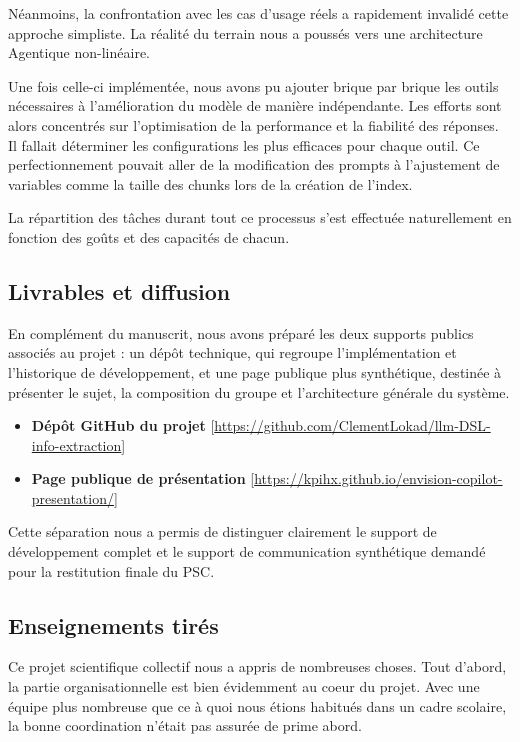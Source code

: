 Néanmoins, la confrontation avec les cas d'usage réels a rapidement invalidé cette approche simpliste. La réalité du terrain nous a poussés vers une architecture Agentique non-linéaire.

Une fois celle-ci implémentée, nous avons pu ajouter brique par brique les outils nécessaires à l'amélioration du modèle de manière indépendante. Les efforts sont alors concentrés sur l'optimisation de la performance et la fiabilité des réponses. Il fallait déterminer les configurations les plus efficaces pour chaque outil. Ce perfectionnement pouvait aller de la modification des prompts à l'ajustement de variables comme la taille des chunks lors de la création de l'index.

La répartition des tâches durant tout ce processus s’est effectuée naturellement en fonction des goûts et des capacités de chacun. 

\subsection{Livrables et diffusion}
En complément du manuscrit, nous avons préparé les deux supports publics associés au projet : un dépôt technique, qui regroupe l'implémentation et l'historique de développement, et une page publique plus synthétique, destinée à présenter le sujet, la composition du groupe et l'architecture générale du système.

\begin{itemize}
    \item \textbf{\textcolor{blue!70!black}{Dépôt GitHub du projet}} [\url{https://github.com/ClementLokad/llm-DSL-info-extraction}]
    \item \textbf{\textcolor{green!45!black}{Page publique de présentation}} [\url{https://kpihx.github.io/envision-copilot-presentation/}]
\end{itemize}

Cette séparation nous a permis de distinguer clairement le support de développement complet et le support de communication synthétique demandé pour la restitution finale du PSC.

\subsection{Enseignements tirés}
    Ce projet scientifique collectif nous a appris de nombreuses choses.
Tout d'abord, la partie organisationnelle est bien évidemment au coeur du projet. Avec une équipe plus nombreuse que ce à quoi nous étions habitués dans un cadre scolaire, la bonne coordination n'était pas assurée de prime abord.

